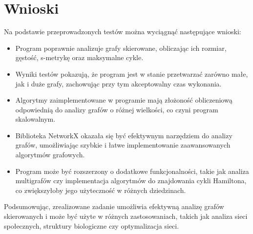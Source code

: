 \documentclass[a4paper, 12pt]{article}
\begin{document}
\section*{Wnioski}

Na podstawie przeprowadzonych testów można wyciągnąć następujące wnioski:

\begin{itemize}
    \item Program poprawnie analizuje grafy skierowane, obliczając ich rozmiar, gęstość, s-metrykę oraz maksymalne cykle.
    \item Wyniki testów pokazują, że program jest w stanie przetwarzać zarówno małe, jak i duże grafy, zachowując przy tym akceptowalny czas wykonania.
    \item Algorytmy zaimplementowane w programie mają złożoność obliczeniową odpowiednią do analizy grafów o różnej wielkości, co czyni program skalowalnym.
    \item Biblioteka NetworkX okazała się być efektywnym narzędziem do analizy grafów, umożliwiając szybkie i łatwe implementowanie zaawansowanych algorytmów grafowych.
    \item Program może być rozszerzony o dodatkowe funkcjonalności, takie jak analiza multigrafów czy implementacja algorytmów do znajdowania cykli Hamiltona, co zwiększyłoby jego użyteczność w różnych dziedzinach.
\end{itemize}

Podsumowując, zrealizowane zadanie umożliwia efektywną analizę grafów skierowanych i może być użyte w różnych zastosowaniach, takich jak analiza sieci społecznych, struktury biologiczne czy optymalizacja sieci.

\newpage
{}


\end{document}
